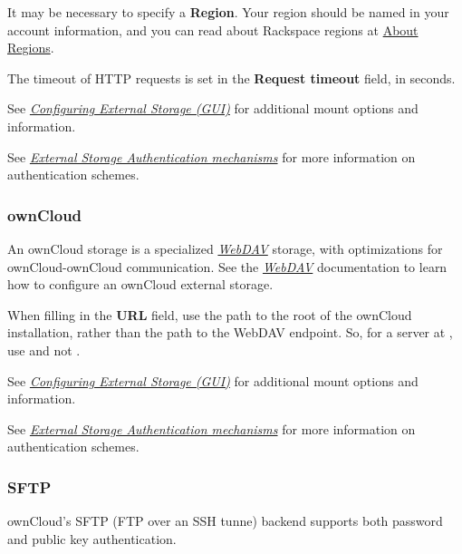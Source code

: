 \documentclass[letterpaper,10pt,english]{sphinxmanual}
\begin{document}
It may be necessary to specify a \textbf{Region}. Your region should be named in
your account information, and you can read about Rackspace regions at
\href{https://support.rackspace.com/how-to/about-regions/}{About Regions}.

The timeout of HTTP requests is set in the \textbf{Request timeout} field, in
seconds.

See {\hyperref[configuration_files/external_storage_configuration_gui::doc]{\emph{\emph{Configuring External Storage (GUI)}}}} for additional mount
options and information.

See {\hyperref[configuration_files/external_storage/auth_mechanisms::doc]{\emph{\emph{External Storage Authentication mechanisms}}}} for more information on authentication schemes.


\subsubsection{ownCloud}
\label{configuration_files/external_storage/owncloud:owncloud}\label{configuration_files/external_storage/owncloud::doc}
An ownCloud storage is a specialized {\hyperref[configuration_files/external_storage/webdav::doc]{\emph{\emph{WebDAV}}}} storage, with optimizations
for ownCloud-ownCloud communication. See the {\hyperref[configuration_files/external_storage/webdav::doc]{\emph{\emph{WebDAV}}}} documentation to
learn how to configure an ownCloud external storage.

When filling in the \textbf{URL} field, use the path to the root of the ownCloud
installation, rather than the path to the WebDAV endpoint. So, for a server at
, use  and not
.

See {\hyperref[configuration_files/external_storage_configuration_gui::doc]{\emph{\emph{Configuring External Storage (GUI)}}}} for additional mount
options and information.

See {\hyperref[configuration_files/external_storage/auth_mechanisms::doc]{\emph{\emph{External Storage Authentication mechanisms}}}} for more information on authentication schemes.


\subsubsection{SFTP}
\label{configuration_files/external_storage/sftp::doc}\label{configuration_files/external_storage/sftp:sftp}
ownCloud's SFTP (FTP over an SSH tunne) backend supports both password and
public key authentication.
\end{document}

